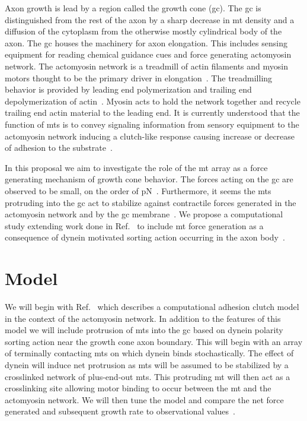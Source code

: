 \documentclass[a4paper, 12pt]{article}
\begin{document}
Axon growth is lead by a region called the growth cone (gc). The gc is distinguished from the rest of the axon by a sharp decrease in mt density and a diffusion of the cytoplasm from the otherwise mostly cylindrical body of the axon. The gc houses the machinery for axon elongation. This includes sensing equipment for reading chemical guidance cues and force generating actomyosin network. The actomyosin network is a treadmill of actin filaments and myosin motors thought to be the primary driver in elongation~\cite{craig2012bj}. The treadmilling behavior is provided by leading end polymerization and trailing end depolymerization of actin~\cite{craig2012bj}. Myosin acts to hold the network together and recycle trailing end actin material to the leading end. It is currently understood that the function of mts is to convey signaling information from sensory equipment to the actomyosin network inducing a clutch-like response causing increase or decrease of adhesion to the substrate~\cite{craig2012bj,kalil2005con,sanchez-huertas2021fmn}.

In this proposal we aim to investigate the role of the mt array as a force generating mechanism of growth cone behavior. The forces acting on the gc are observed to be small, on the order of pN~\cite{raffa2023scdb,devincentiis2020jn}. Furthermore, it seems the mts protruding into the gc act to stabilize against contractile forces generated in the actomyosin network and by the gc membrane~\cite{raffa2023scdb}. We propose a computational study extending work done in Ref.~\cite{craig2015pb} to include mt force generation as a consequence of dynein motivated sorting action occurring in the axon body~\cite{nedelec1997n13}.

\section*{Model}

We will begin with Ref.~\cite{craig2015pb} which describes a computational adhesion clutch model in the context of the actomyosin network. In addition to the features of this model we will include protrusion of mts into the gc based on dynein polarity sorting action near the growth cone axon boundary. This will begin with an array of terminally contacting mts on which dynein binds stochastically. The effect of dynein will induce net protrusion as mts will be assumed to be stabilized by a crosslinked network of plus-end-out mts. This protruding mt will then act as a crosslinking site allowing motor binding to occur between the mt and the actomyosin network. We will then tune the model and compare the net force generated and subsequent growth rate to observational values~\cite{raffa2023scdb,devincentiis2020jn}.


\end{document}
